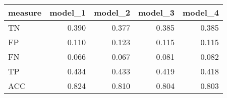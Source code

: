 \begin{tabular}{lrrrr}
\toprule
measure &  model\_1 &  model\_2 &  model\_3 &  model\_4 \\
\midrule
     TN &    0.390 &    0.377 &    0.385 &    0.385 \\
     FP &    0.110 &    0.123 &    0.115 &    0.115 \\
     FN &    0.066 &    0.067 &    0.081 &    0.082 \\
     TP &    0.434 &    0.433 &    0.419 &    0.418 \\
    ACC &    0.824 &    0.810 &    0.804 &    0.803 \\
\bottomrule
\end{tabular}
